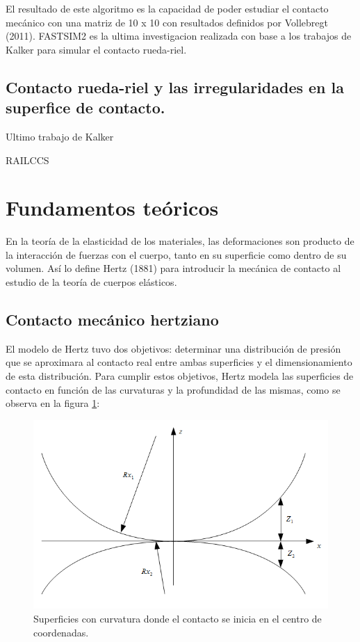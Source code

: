 \documentclass[main]{subfiles}
\begin{document}
El resultado de este algoritmo es la capacidad de poder estudiar el contacto mecánico con una matriz de 10 x 10 con resultados definidos por Vollebregt (2011). FASTSIM2 es la ultima investigacion realizada con base a los trabajos de Kalker para simular el contacto rueda-riel.

\subsection{Contacto rueda-riel y las irregularidades en la superfice de contacto.}

Ultimo trabajo de Kalker

RAILCCS

\section{Fundamentos teóricos}

En la teoría de la elasticidad de los materiales, las deformaciones son producto de la interacción de fuerzas con el cuerpo, tanto en su superficie como dentro de su volumen. Así lo define Hertz (1881) para introducir la mecánica de contacto al estudio de la teoría de cuerpos elásticos.

\subsection{Contacto mecánico hertziano}

 El modelo de Hertz tuvo dos objetivos: determinar una distribución de presión que se aproximara al contacto real entre ambas superficies y el dimensionamiento de esta distribución. Para cumplir estos objetivos, Hertz modela las superficies de contacto en función de las curvaturas y la profundidad de las mismas, como se observa en la figura \ref{fig:PlotZAB}:
  
\begin{figure}[!htbp]
\centering
    \includegraphics[scale=0.7]{FigZZ.png}
  \caption{Superficies con curvatura donde el contacto se inicia en el centro de coordenadas.}
  \label{fig:PlotZAB}
\end{figure}  
  
\end{document}
